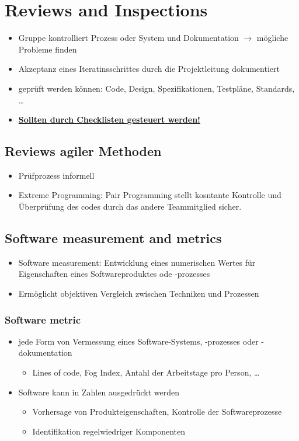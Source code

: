 \section{Reviews and Inspections}
\begin{itemize}
    \item Gruppe kontrolliert Prozess oder System und Dokumentation $\rightarrow$ mögliche Probleme finden
    \item Akzeptanz eines Iteratinsschrittes durch die Projektleitung dokumentiert
    \item geprüft werden können: Code, Design, Spezifikationen, Testpläne, Standards, \dots
    \item \textbf{\underline{Sollten durch Checklisten gesteuert werden!}}
\end{itemize}

\subsection{Reviews agiler Methoden} 
\begin{itemize}
    \item Prüfprozess informell
    \item Extreme Programming: Pair Programming stellt kosntante Kontrolle und Überprüfung des codes durch das andere Teammitglied sicher. 
\end{itemize}

\subsection{Software measurement and metrics}
\begin{itemize}
    \item Software measurement: Entwicklung eines numerischen Wertes für Eigenschaften eines Softwareproduktes ode -prozesses
    \item Ermöglicht objektiven Vergleich zwischen Techniken und Prozessen
\end{itemize}
\subsubsection{Software metric}
\begin{itemize}
    \item jede Form von Vermessung eines Software-Systems, -prozesses oder -dokumentation
    \begin{itemize}
        \item Lines of code, Fog Index, Antahl der Arbeitstage pro Person, \dots
    \end{itemize}
    \item Software kann in Zahlen ausgedrückt werden
    \begin{itemize}
        \item Vorhersage von Produkteigenschaften, Kontrolle der Softwareprozesse
        \item Identifikation regelwiedriger Komponenten
    \end{itemize}
\end{itemize}


